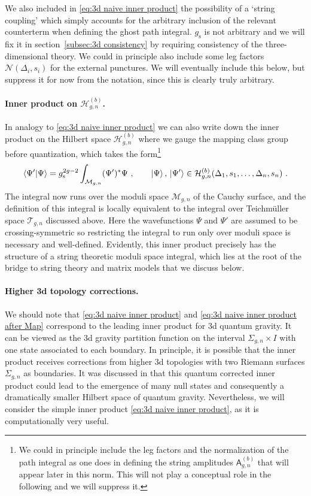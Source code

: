 \documentclass[12pt,a4paper]{article}
\newcommand{\be}{\begin{equation}}
\newcommand{\ee}{\end{equation}}
\begin{document}
We also included in \eqref{eq:3d naive inner product} the possibility of a `string coupling' which simply accounts for the arbitrary inclusion of the relevant counterterm when defining the ghost path integral. $g_\text{s}$ is not arbitrary and we will fix it in section~\ref{subsec:3d consistency} by requiring consistency of the three-dimensional theory. We could in principle also include some leg factors $\mathcal{N}(\Delta_i,s_i)$ for the external punctures. We will eventually include this below, but suppress it for now from the notation, since this is clearly truly arbitrary.

\paragraph{Inner product on $\mathcal{H}_{g,n}^{(b)}$.} In analogy to \eqref{eq:3d naive inner product} we can also write down the inner product on the Hilbert space $\mathcal{H}^{(b)}_{g,n}$ where we gauge the mapping class group before quantization, which takes the form\footnote{We could in principle include the leg factors and the normalization of the path integral as one does in defining the string amplitudes $\mathsf{A}_{g,n}^{(b)}$ \cite{paper1} that will appear later in this norm. This will not play a conceptual role in the following and we will suppress it.} 
\be 
\langle \Psi' | \Psi \rangle = g_\text{s}^{2g-2}\int_{\mathcal{M}_{g,n}}  (\Psi')^* \Psi~, \qquad \ket{\Psi},\, \ket{\Psi'} \in {\mathcal{H}}^{(b)}_{g,n}(\Delta_1,s_1,\ldots,\Delta_n,s_n)~.\label{eq:3d naive inner product after Map}
\ee
The integral now runs over the moduli space $\mathcal{M}_{g,n}$ of the Cauchy surface, and the definition of this integral is locally equivalent to the integral over Teichm\"uller space $\mathcal{T}_{g,n}$ discussed above. Here the wavefunctions $\Psi$ and $\Psi'$ are assumed to be crossing-symmetric so restricting the integral to run only over moduli space is necessary and well-defined.
Evidently, this inner product precisely has the structure of a string theoretic moduli space integral, which lies at the root of the bridge to string theory and matrix models that we discuss below.

\paragraph{Higher 3d topology corrections.} We should note that \eqref{eq:3d naive inner product} and \eqref{eq:3d naive inner product after Map} correspond to the leading inner product for 3d quantum gravity. It can be viewed as the 3d gravity partition function on the interval $\Sigma_{g,n} \times I$ with one state associated to each boundary. In principle, it is possible that the inner product receives corrections from higher 3d topologies with two Riemann surfaces $\Sigma_{g,n}$ as boundaries. It was discussed in \cite{Marolf:2020xie, Iliesiu:2024cnh} that this quantum corrected inner product could lead to the emergence of many null states and consequently a dramatically smaller Hilbert space of quantum gravity. Nevertheless, we will consider the simple inner product \eqref{eq:3d naive inner product}, as it is computationally very useful.
\end{document}
